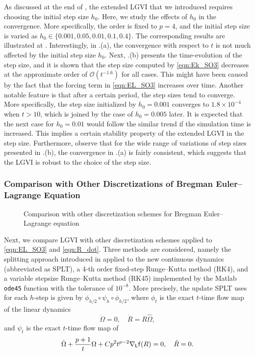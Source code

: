 \documentclass[letterpaper, 10pt, conference]{ieeeconf}
\renewcommand{\L}{\ensuremath{\mathsf{L}}}
\begin{document}
As discussed at the end of , the extended LGVI that we introduced requires choosing the initial step size $h_0$. 
Here, we study the effects of $h_0$ in the convergence.
More specifically, the order is fixed to $p=4$, and the initial step size is varied as $h_0\in\{0.001, 0.05, 0.01, 0.1, 0.4\}$.
The corresponding results are illustrated at .
Interestingly, in .(a), the convergence with respect to $t$ is not much affected by the initial step size $h_0$.
Next, .(b) presents the time-evolution of the step size, and it is shown that the step size computed by \eqref{eqn:Ek_SO3} decreases at the approximate order of $\mathcal{O}(t^{-1.6})$  for all cases. 
This might have been caused by the fact that the forcing term in \eqref{eqn:EL_SO3} increases over time.
Another notable feature is that after a certain period, the step sizes tend to converge. 
More specifically, the step size initialized by $h_0=0.001$ converges to $1.8\times 10^{-4}$ when $t>10$, which is joined by the case of $h_0=0.005$ later. 
It is expected that the next case for $h_0=0.01$ would follow the similar trend if the simulation time is increased.
This implies a certain stability property of the extended LGVI in the step size.
Furthermore, observe that for the wide range of variations of step sizes presented in .(b), the convergence in .(a) is fairly consistent, which suggests that the LGVI is robust to the choice of the step size. 

\subsubsection{Comparison with Other Discretizations of Bregman Euler--Lagrange Equation}

\begin{figure}
    \centerline{
    }
    \centerline{
    }
    \caption{Comparison with other discretization schemes for Bregman Euler--Lagrange equation}\label{fig:comp_disc}
\end{figure}

Next, we compare LGVI with other discretization schemes applied to \eqref{eqn:EL_SO3} and \eqref{eqn:R_dot}.
Three methods are considered, namely the splitting approach introduced in \cite{tao2020variational} applied to the new continuous dynamics (abbreviated as SPLT), a 4-th order fixed-step Runge--Kutta method (RK4), and a variable stepsize Runge--Kutta method (RK45) implemented by the Matlab \texttt{ode45} function with the tolerance of $10^{-8}$. More precisely, the update SPLT uses for each $h$-step is given by $\phi_{h/2} \circ \psi_h \circ \phi_{h/2}$, where $\phi_t$ is the exact $t$-time flow map of the linear dynamics
\[
    \dot\Omega = 0, \quad \dot R=R\hat{\Omega},
\]
and $\psi_t$ is the exact $t$-time flow map of
\[
    \dot\Omega + \frac{p+1}{t} \Omega + C p^2 t^{p-2} \nabla_\L \obj(R) = 0, \quad \dot R = 0.
\]
\end{document}
